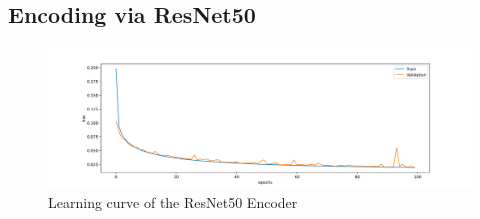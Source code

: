 \subsection{Encoding via ResNet50}

\begin{figure}[!ht]
    \centering
    \includegraphics[width=\textwidth,trim={0 1cm 0 1cm},clip]{./results/resnet50_vgg19/20230514_213740_results.png}
    \caption{Learning curve of the ResNet50 Encoder}
    \label{fig:resnet50_learning_curve}
\end{figure}



